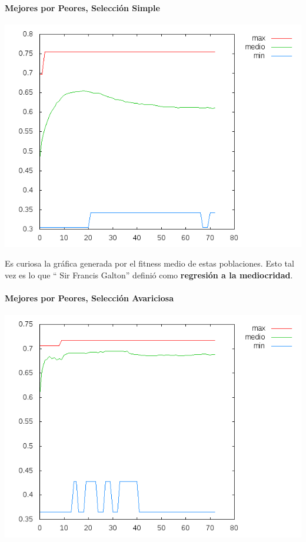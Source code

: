 \documentclass[nochap]{apuntes}
\begin{document}
\paragraph{Mejores por Peores, Selección Simple}
\begin{center}
\includegraphics[scale=0.6]{tex/img/g73_p73_MejoresPorPeores_SeleccionSimple_reg11.png}
\end{center}

Es curiosa la gráfica generada por el fitness medio de estas poblaciones. Esto tal vez es lo que `` Sir Francis Galton'' definió como \textbf{regresión a la mediocridad}. 


\paragraph{Mejores por Peores, Selección Avariciosa}
\begin{center}
\includegraphics[scale=0.6]{tex/img/g73_p73_MejoresPorPeores_SeleccionAvariciosa_reg11.png}
\end{center}
\end{document}
